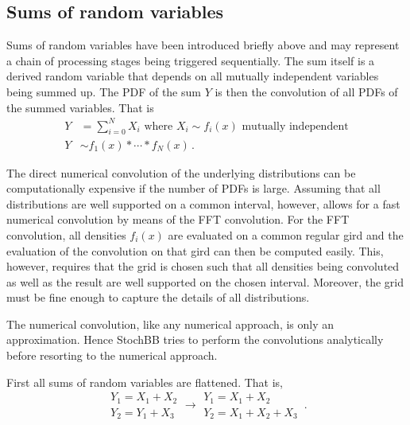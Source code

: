 \subsection{Sums of random variables}
Sums of random variables have been introduced briefly above and may represent a chain of processing
stages being triggered sequentially. The sum itself is a derived random variable that depends on all
mutually independent variables being summed up. The PDF of the sum $Y$ is then the convolution of all
PDFs of the summed variables. That is
\begin{align}
 Y &= \sum_{i=0}^NX_i\text{ where } X_i \sim f_i(x)\text{ mutually independent} \nonumber \\
 Y &\sim f_1(x) \ast \cdots \ast f_N(x)\,. \nonumber
\end{align}

The direct numerical convolution of the underlying distributions can be computationally expensive if the
number of PDFs is large. Assuming that all distributions are well supported on a common interval, however, 
allows for a fast numerical convolution by means of the FFT convolution. For the FFT convolution, all 
densities $f_i(x)$ are evaluated on a common regular gird and the evaluation of the convolution on that gird
can then be computed easily. This, however, requires that the grid is chosen such that all densities being
convoluted as well as the result are well supported on the chosen interval. Moreover, the grid must be fine 
enough to capture the details of all distributions. 

The numerical convolution, like any numerical approach, is only an approximation. Hence StochBB tries to perform
the convolutions analytically before resorting to the numerical approach. 

First all sums of random variables are flattened. That is, 
\begin{equation}
 \begin{array}{l}
  Y_1 = X_1 + X_2\\
  Y_2 = Y_1 + X_3 
 \end{array} \longrightarrow 
 \begin{array}{l}
  Y_1 = X_1 + X_2\\
  Y_2 = X_1 + X_2 + X_3 
 \end{array}\,. \nonumber
\end{equation}

